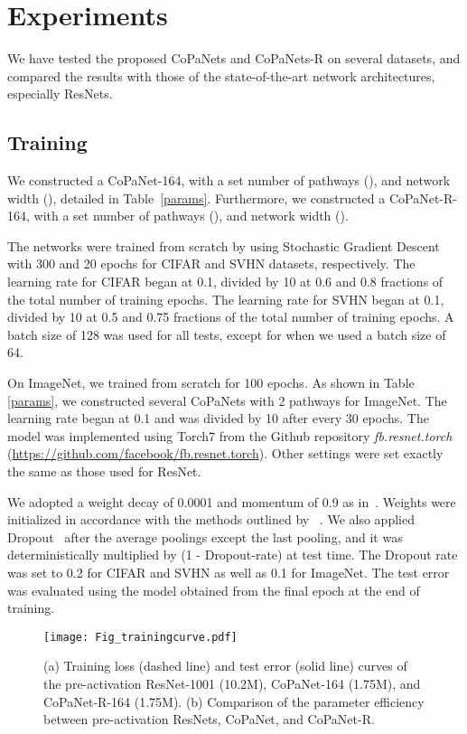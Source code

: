 \documentclass[wcp]{jmlr}
\begin{document}
\section{Experiments}
We have tested the proposed CoPaNets and CoPaNets-R on several datasets, and compared the results with those of the state-of-the-art network architectures, especially ResNets.

\subsection{Training}

We constructed a CoPaNet-164, with a set number of pathways (), and network width (), detailed in Table~\ref{params}. 
Furthermore, we constructed a CoPaNet-R-164, with a set number of pathways (), and network width (). 

The networks were trained from scratch by using Stochastic Gradient Descent with 300 and 20 epochs for CIFAR and SVHN datasets, respectively. 
The learning rate for CIFAR began at 0.1, divided by 10 at 0.6 and 0.8 fractions of the total number of training epochs. 
The learning rate for SVHN began at 0.1, divided by 10 at 0.5 and 0.75 fractions of the total number of training epochs. 
A batch size of 128 was used for all tests, except for  when we used a batch size of 64. 

On ImageNet, we trained from scratch for 100 epochs.
As shown in Table \ref{params}, we constructed several CoPaNets with 2 pathways for ImageNet. 
The learning rate began at 0.1 and was divided by 10 after every 30 epochs.
The model was implemented using Torch7 from the Github repository \textit{fb.resnet.torch} (\url{https://github.com/facebook/fb.resnet.torch}).
Other settings were set exactly the same as those used for ResNet.

We adopted a weight decay of 0.0001 and momentum of 0.9 as in~\citep{he2015deep}.
Weights were initialized in accordance with the methods outlined by ~\cite{he2015delving}. 
We also applied Dropout~\citep{srivastava2014dropout} after the average poolings except the last pooling, and it was deterministically multiplied by (1 - Dropout-rate) at test time.
The Dropout rate was set to 0.2 for CIFAR and SVHN as well as 0.1 for ImageNet. 
The test error was evaluated using the model obtained from the final epoch at the end of training.

\begin{figure*}
\begin{center}
	\texttt{[image: Fig\_trainingcurve.pdf]}
\end{center}
   \caption{ (a) Training loss (dashed line) and test error (solid line) curves of the pre-activation ResNet-1001 (10.2M), CoPaNet-164 (1.75M), and  CoPaNet-R-164 (1.75M). (b) Comparison of the parameter efficiency between pre-activation ResNets, CoPaNet, and CoPaNet-R.}
\label{curve}
\end{figure*}
\end{document}
